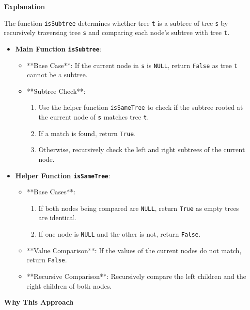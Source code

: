 \textbf{Explanation}

The function \texttt{isSubtree} determines whether tree \texttt{t} is a subtree of tree \texttt{s} by recursively traversing tree \texttt{s} and comparing each node's subtree with tree \texttt{t}.

\begin{itemize}
    \item \textbf{Main Function \texttt{isSubtree}}:
    \begin{itemize}
        \item **Base Case**: If the current node in \texttt{s} is \texttt{NULL}, return \texttt{False} as tree \texttt{t} cannot be a subtree.
        \item **Subtree Check**: 
        \begin{enumerate}
            \item Use the helper function \texttt{isSameTree} to check if the subtree rooted at the current node of \texttt{s} matches tree \texttt{t}.
            \item If a match is found, return \texttt{True}.
            \item Otherwise, recursively check the left and right subtrees of the current node.
        \end{enumerate}
    \end{itemize}
    
    \item \textbf{Helper Function \texttt{isSameTree}}:
    \begin{itemize}
        \item **Base Cases**:
        \begin{enumerate}
            \item If both nodes being compared are \texttt{NULL}, return \texttt{True} as empty trees are identical.
            \item If one node is \texttt{NULL} and the other is not, return \texttt{False}.
        \end{enumerate}
        \item **Value Comparison**: If the values of the current nodes do not match, return \texttt{False}.
        \item **Recursive Comparison**: Recursively compare the left children and the right children of both nodes.
    \end{itemize}
\end{itemize}

\textbf{Why This Approach}

